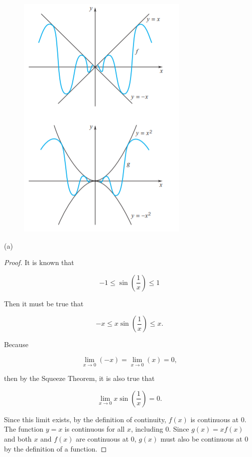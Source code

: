 \documentclass{article}
\begin{document}
    \begin{figure}[hbt!]
        \centering
        \includegraphics[]{Homework3_Fig1.png}
    \end{figure}

    \pagebreak
    \thispagestyle{page3}



    (a)
    \begin{proof}
        It is known that

        \[
            -1 \leq \sin{\left(\frac{1}{x}\right)} \leq 1
        \]

        Then it must be true that

        \[
            -x \leq x\sin{\left(\frac{1}{x}\right)} \leq x.
        \]

        Because

        \[
            \lim_{x\to 0} (-x) = \lim_{x\to 0} (x) = 0,
        \]

        then by the Squeeze Theorem, it is also true that

        \[
            \lim_{x\to 0} x\sin{\left(\frac{1}{x}\right)} = 0.
        \]

        Since this limit exists, by the definition of continuity, $f(x)$ is continuous at 0. \\

        The function $y=x$ is continuous for all $x$, including 0. Since $g(x)=xf(x)$ and both $x$ and $f(x)$ are continuous at 0, $g(x)$ must also be continuous at 0 by the definition of a function.
    \end{proof}
\end{document}
